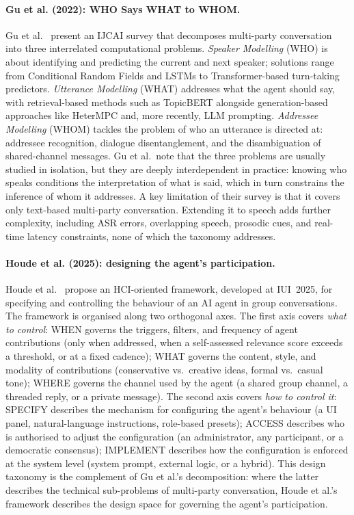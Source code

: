 \paragraph{Gu et al. (2022): WHO Says WHAT to WHOM.}
Gu et al.~\cite{gu2022mpc} present an IJCAI survey that decomposes multi-party conversation into three interrelated computational problems. \emph{Speaker Modelling} (WHO) is about identifying and predicting the current and next speaker; solutions range from Conditional Random Fields and LSTMs to Transformer-based turn-taking predictors. \emph{Utterance Modelling} (WHAT) addresses what the agent should say, with retrieval-based methods such as TopicBERT alongside generation-based approaches like HeterMPC and, more recently, LLM prompting. \emph{Addressee Modelling} (WHOM) tackles the problem of who an utterance is directed at: addressee recognition, dialogue disentanglement, and the disambiguation of shared-channel messages. Gu et al.\ note that the three problems are usually studied in isolation, but they are deeply interdependent in practice: knowing who speaks conditions the interpretation of what is said, which in turn constrains the inference of whom it addresses. A key limitation of their survey is that it covers only text-based multi-party conversation. Extending it to speech adds further complexity, including ASR errors, overlapping speech, prosodic cues, and real-time latency constraints, none of which the taxonomy addresses.

\paragraph{Houde et al. (2025): designing the agent's participation.}
Houde et al.~\cite{houde2025koala} propose an HCI-oriented framework, developed at IUI~2025, for specifying and controlling the behaviour of an AI agent in group conversations. The framework is organised along two orthogonal axes. The first axis covers \emph{what to control}: WHEN governs the triggers, filters, and frequency of agent contributions (only when addressed, when a self-assessed relevance score exceeds a threshold, or at a fixed cadence); WHAT governs the content, style, and modality of contributions (conservative vs.\ creative ideas, formal vs.\ casual tone); WHERE governs the channel used by the agent (a shared group channel, a threaded reply, or a private message). The second axis covers \emph{how to control it}: SPECIFY describes the mechanism for configuring the agent's behaviour (a UI panel, natural-language instructions, role-based presets); ACCESS describes who is authorised to adjust the configuration (an administrator, any participant, or a democratic consensus); IMPLEMENT describes how the configuration is enforced at the system level (system prompt, external logic, or a hybrid). This design taxonomy is the complement of Gu et al.'s decomposition: where the latter describes the technical sub-problems of multi-party conversation, Houde et al.'s framework describes the design space for governing the agent's participation.

